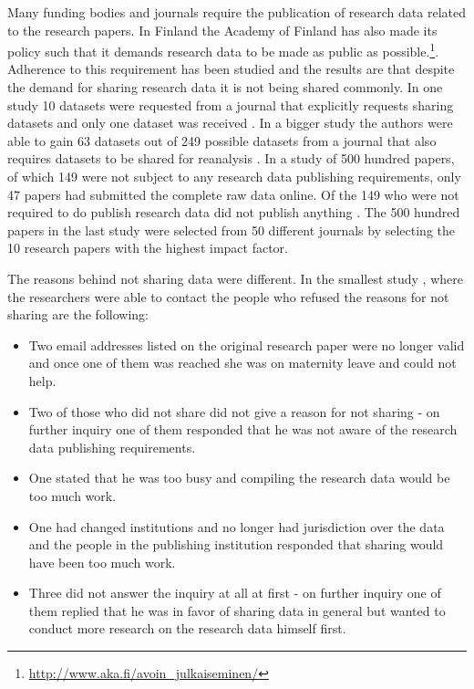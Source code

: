 Many funding bodies and journals require the publication of research data
related to the research papers. In Finland the Academy of Finland has also made
its policy such that it demands research data to be made as public as
possible.\footnote{\url{http://www.aka.fi/avoin\_julkaiseminen/}}.
Adherence to this requirement has been studied
and the results are that despite the demand for sharing research data it is not
being shared commonly. In one study 10 datasets were requested from a journal
that explicitly requests sharing datasets and only one dataset was received
\cite{savage2009empirical}. In a bigger study the authors were able to gain
63 datasets out of 249 possible datasets from a journal that also requires
datasets to be shared for reanalysis \cite{wicherts2006poor}. In a study of
500 hundred papers, of which 149 were not subject to any research data
publishing requirements, only 47 papers had submitted the complete raw data
online. Of the 149 who were not required to do publish research data did not
publish anything \cite{alsheikh2011public}. The 500 hundred papers in the last
study were selected from 50 different journals by selecting the 10 research
papers with the highest impact factor.

The reasons behind not sharing data were different. In the smallest study \cite{savage2009empirical},
where the researchers were able to contact the people who refused the reasons
for not sharing are the following:

\begin{itemize}
    \item Two email addresses listed on the original research paper were no
          longer valid and once one of them was reached she was on maternity
          leave and could not help.
    \item Two of those who did not share did not give a reason for not sharing - on further
          inquiry one of them responded that he was not aware of the research
          data publishing requirements.
    \item One stated that he was too busy and compiling the research data
          would be too much work.
    \item One had changed institutions and no longer had jurisdiction over the
          data and the people in the publishing institution responded that
          sharing would have been too much work.
    \item Three did not answer the inquiry at all at first - on further inquiry
          one of them replied that he was in favor of sharing data in general
          but wanted to conduct more research on the research data himself
          first.
\end{itemize}

